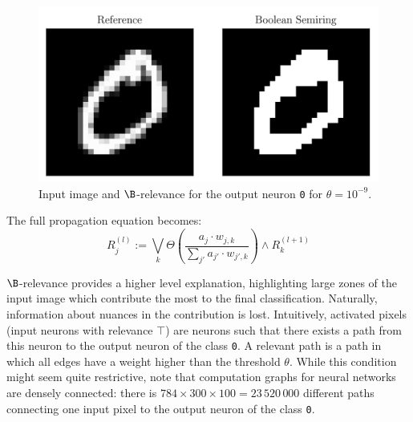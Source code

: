 \documentclass[twocolumn]{../cs-classes/cs-classes}
\newcommand*{\1}{\digitsbb{1}}
\newcommand*{\0}{\digitsbb{0}}
\begin{document}
\begin{figure}[H]
    \centering
    \includegraphics[width=.9\linewidth]{boolean.png}
    \caption{Input image and $\B$-relevance for the output neuron \texttt{0} for $\theta=10^{-9}$.}
    \label{fig:mnist-boolean}
\end{figure}

The full propagation equation becomes:
\begin{equation}
    \tag{$\B$-LRP}
    R^{(l)}_j := \bigvee_{k}\Theta\left(\frac{a_j\cdot w_{j, k}}{\sum_{j'}a_{j'}\cdot w_{j', k}}\right) \land R^{(l+1)}_k
    \label{eq:boolean-lrp}
\end{equation}

$\B$-relevance provides a higher level explanation, highlighting large zones of the input image which contribute the most to the final classification.
Naturally, information about nuances in the contribution is lost. Intuitively, activated pixels (input neurons with relevance $\top$) are neurons such that there exists a  path from this neuron to the output neuron of the class \texttt{0}. A relevant path is a path in which all edges have a weight higher than the threshold $\theta$. While this condition might seem quite restrictive, note that computation graphs for neural networks are densely connected: there is $784\times300\times100=23\,520\,000$ different paths connecting one input pixel to the output neuron of the class \texttt{0}.
\end{document}
